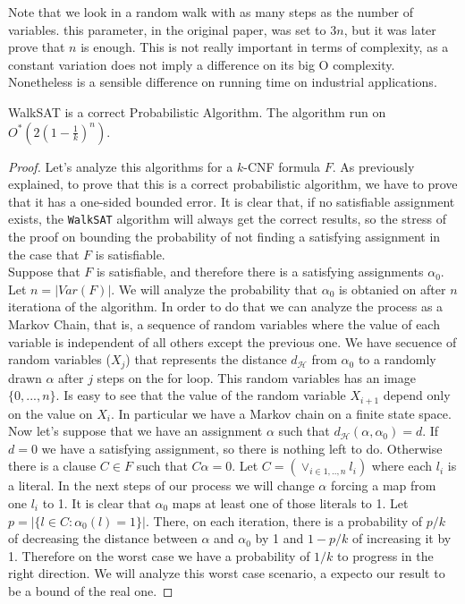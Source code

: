   Note that we look in a random walk with as many steps as the number of variables. this parameter, in the original paper, was set to $3n$, but it was later prove that $n$ is enough. This is not really important in terms of complexity, as a constant variation does not imply a difference on its big O complexity. Nonetheless is a sensible difference on running time on industrial applications. \\

  \begin{theorem}
    WalkSAT is a correct Probabilistic Algorithm. The algorithm run on $O^*(2 (1 - \frac{1}{k})^n)$.
  \end{theorem}

  \begin{proof}
    Let's analyze this algorithms for a $k$-CNF formula $F$. As previously explained, to prove that this is a correct probabilistic algorithm, we have to prove that it has a one-sided bounded error. It is clear that, if no satisfiable assignment exists, the \texttt{WalkSAT} algorithm will always get the correct results, so the stress of the proof on bounding the probability of not finding a satisfying assignment in the case that $F$ is satisfiable.\\


    Suppose that $F$ is satisfiable, and therefore there is a satisfying assignments $\alpha_0$. Let $n=|Var(F)|$.  We will analyze the probability that $\alpha_0$ is obtanied on after $n$ iterationa of the algorithm. In order to do that we can analyze the process as a Markov Chain, that is, a sequence of random variables where the value of each variable is independent of all others except the previous one. We have secuence of random variables ($X_j$) that represents the distance $d_\mathcal{H}$ from $\alpha_0$ to a randomly drawn $\alpha$ after $j$ steps on the for loop. This random variables has an image $\{0,...,n\}$. Is easy to see that the value of the random variable $X_{i+1}$ depend only on the value on $X_i$. In particular we have a  Markov chain on a finite state space.\\

    Now let's suppose that we have an assignment $\alpha$ such that $d_\mathcal{H}(\alpha, \alpha_0) = d$. If $d=0$ we have a satisfying assignment, so there is nothing left to do. Otherwise there is a clause $C\in F$ such that $C\alpha = 0$. Let $C = (\lor_{i\in 1,..,n} l_i )$ where each $l_i$ is a literal. In the next steps of our process we will change $\alpha$ forcing a map from one $l_i$ to 1. It is clear that $\alpha_0$ maps at least one of those literals to 1. Let $p = |\{l \in C : \alpha_0(l) = 1\}|$. There, on each iteration, there is a probability of $p/k$ of decreasing the distance between $\alpha$ and $\alpha_0$ by 1 and $1-p/k$ of increasing it by 1. Therefore on the worst case we have a probability of $1/k$ to progress in the right direction. We will analyze this worst case scenario, a expecto our result to be a bound of the real one. 


\end{proof}
